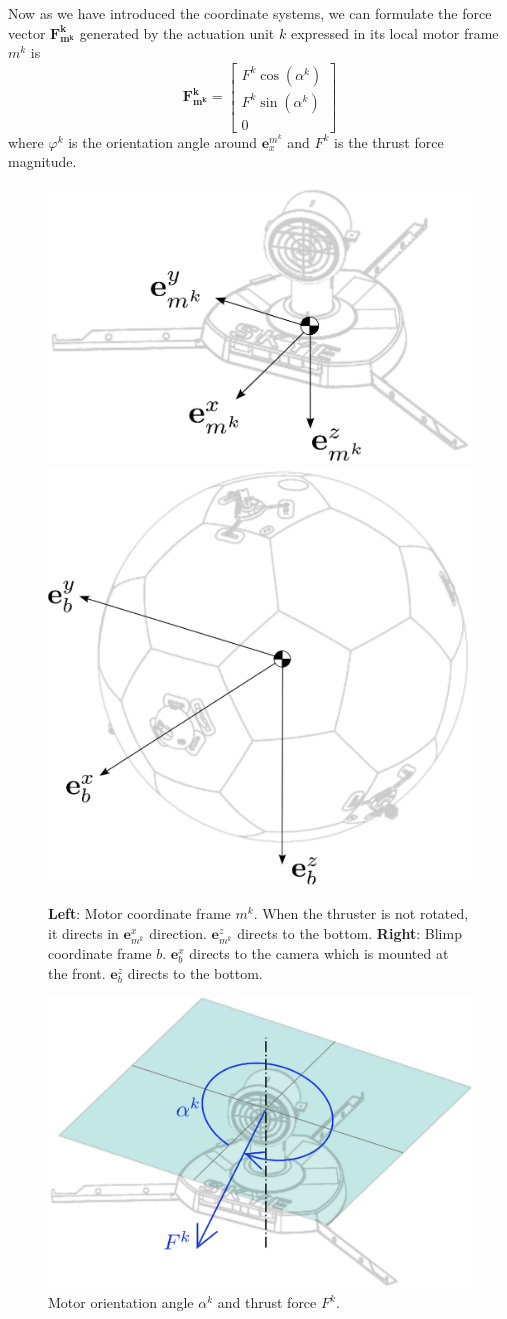 Now as we have introduced the coordinate systems, we can formulate the force vector $\mathbf{F_{m^k}^k}$ generated by the actuation unit $k$ expressed in its local motor frame $m^k$ is
\begin{equation}
\mathbf{F_{m^k}^k} = 
\left[\begin{array}{c}
F^k \cos(\alpha^k) \\
F^k \sin(\alpha^k) \\
0
\end{array}\right]
\end{equation}
where $\varphi^k$ is the orientation angle around $\mathbf{e}^{m^k}_x$ and $F^k$ is the thrust force magnitude.

\begin{figure}[hbtp]
\centering
\includegraphics[width=.4\linewidth]{images/motor_frame.eps}
\includegraphics[width=.4\linewidth]{images/blimp_frame.eps}
\caption{\textbf{Left}: Motor coordinate frame $m^k$. When the thruster is not rotated, it directs in $\mathbf{e}^x_{m^k}$ direction. $\mathbf{e}^z_{m^k}$ directs to the bottom.
\textbf{Right}: Blimp coordinate frame $b$. $\mathbf{e}^x_{b}$ directs to the camera which is mounted at the front. 
$\mathbf{e}^z_{b}$ directs to the bottom.}
\label{fig:frames}
\end{figure}


\begin{figure}[hbtp]
\centering
\includegraphics[width=.4\linewidth]{images/motor_force.eps}
\caption{Motor orientation angle $\alpha^k$ and thrust force $F^k$.}
\label{fig:motor_force}
\end{figure}


